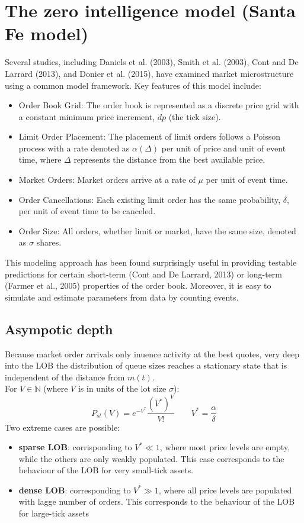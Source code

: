 \section{The zero intelligence model (Santa Fe model)}
Several studies, including Daniels et al. (2003), Smith et al. (2003), Cont and De Larrard (2013), and Donier et al. (2015), have examined market microstructure using a common model framework. Key features of this model include:
\begin{itemize}
\item Order Book Grid: The order book is represented as a discrete price grid with a constant minimum price increment, $dp$ (the tick size).

\item Limit Order Placement: The placement of limit orders follows a Poisson process with a rate denoted as $\alpha(\Delta)$ per unit of price and unit of event time, where $\Delta$ represents the distance from the best available price.

\item Market Orders: Market orders arrive at a rate of $\mu$ per unit of event time.

\item Order Cancellations: Each existing limit order has the same probability, $\delta$, per unit of event time to be canceled.

\item Order Size: All orders, whether limit or market, have the same size, denoted as $\sigma$ shares.

\end{itemize}
This modeling approach has been found surprisingly useful in providing testable predictions for certain short-term (Cont and De Larrard, 2013) or long-term (Farmer et al., 2005) properties of the order book. Moreover, it is easy to simulate and estimate parameters from data by counting events.\\
\subsection{Asympotic depth}
Because market order arrivals only inuence activity at the best quotes, very deep into the LOB the distribution of queue sizes reaches a stationary state that is
independent of the distance from $m(t)$.\\
For $V \in \mathbb{N}$ (where $V$ is in units of the lot size $\sigma$):
\[
P_{st}(V) = e^{-V^*} \frac{(V^*)^V}{V!} \qquad V^* = \frac{\alpha}{\delta}
\]
Two extreme cases are possible:
\begin{itemize}
	\item \textbf{sparse LOB}: corrisponding to $V^* \ll 1$, where most price levels are empty, while the others are only weakly populated. This case corresponds to the behaviour of the LOB for very small-tick assets.
	\item \textbf{dense LOB}: corresponding to $V^* \gg 1$, where all price levels are populated with lagge number of orders. This corresponds to the behaviour of the LOB for large-tick assets
\end{itemize}
